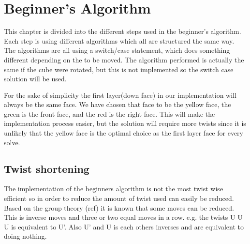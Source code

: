 \chapter{Beginner's Algorithm}

This chapter is divided into the different steps used in the beginner's algorithm.
Each step is using different algorithms which all are structured the same way. The algorithms are all using a switch/case statement, which does something different depending on the \cpiece{} to be moved. The algorithm performed is actually the same if the cube were rotated, but this is not implemented so the switch case solution will be used.

For the sake of simplicity the first layer(down face) in our implementation will always be the same face. We have chosen that face to be the yellow face, the green is the front face, and the red is the right face. This will make the implementation process easier, but the solution will require more twists since it is unlikely that the yellow face is the optimal choice as the first layer face for every solve.









\section{Twist shortening}
The implementation of the beginners algorithm is not the most twist wise efficient so in order to reduce the amount of twist used can easily be reduced. Based on the group theory (ref) it is known that some moves can be reduced. This is inverse moves and  three or two equal moves  in a row. e.g.  the twists U U U is equivalent to U'. Also U' and U is each others inverses and are equivalent to doing nothing. 